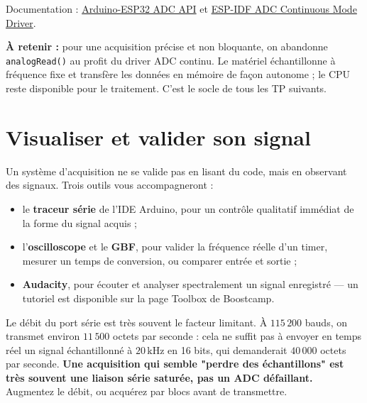 Documentation : \href{https://docs.espressif.com/projects/arduino-esp32/en/latest/api/adc.html}{Arduino-ESP32 ADC API} et \href{https://docs.espressif.com/projects/esp-idf/en/latest/esp32s3/api-reference/peripherals/adc/adc_continuous.html}{ESP-IDF ADC Continuous Mode Driver}. \cite{arduino_adc,esp32s3_adc_continuous}

\begin{imp}
\textbf{À retenir :} pour une acquisition précise et non bloquante, on abandonne \texttt{analogRead()} au profit du driver ADC continu. Le matériel échantillonne à fréquence fixe et transfère les données en mémoire de façon autonome ; le CPU reste disponible pour le traitement. C'est le socle de tous les TP suivants.
\end{imp}

\newpage

\section{Visualiser et valider son signal}

Un système d'acquisition ne se valide pas en lisant du code, mais en observant des signaux. Trois outils vous accompagneront :

\begin{itemize}
    \item le \textbf{traceur série} de l'IDE Arduino, pour un contrôle qualitatif immédiat de la forme du signal acquis ;
    \item l'\textbf{oscilloscope} et le \textbf{GBF}, pour valider la fréquence réelle d'un timer, mesurer un temps de conversion, ou comparer entrée et sortie ;
    \item \textbf{Audacity}, pour écouter et analyser spectralement un signal enregistré — un tutoriel est disponible sur la page Toolbox de Boostcamp.
\end{itemize}

\begin{imp}
Le débit du port série est très souvent le facteur limitant. À $115\,200$ bauds, on transmet environ $11\,500$ octets par seconde : cela ne suffit pas à envoyer en temps réel un signal échantillonné à $20\,\mathrm{kHz}$ en 16 bits, qui demanderait $40\,000$ octets par seconde. \textbf{Une acquisition qui semble "perdre des échantillons" est très souvent une liaison série saturée, pas un ADC défaillant.} Augmentez le débit, ou acquérez par blocs avant de transmettre.
\end{imp}

